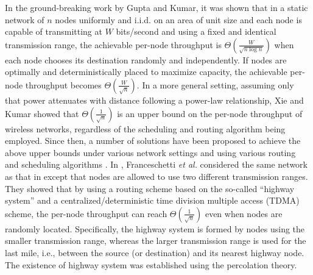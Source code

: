 \documentclass[english]{IEEEtran}
\theoremstyle{plain}
\theoremstyle{plain}
\theoremstyle{plain}
\theoremstyle{remark}
\begin{document}
In the ground-breaking work \cite{Gupta00Capacity} by Gupta and Kumar,
it was shown that in a static network of $n$ nodes uniformly and
i.i.d. on an area of unit size and each node is capable of transmitting
at $W$ bits/second and using a fixed and identical transmission range,
the achievable per-node throughput is $\Theta\left(\frac{W}{\sqrt{n\log n}}\right)$
when each node chooses its destination randomly and independently.
If nodes are optimally and deterministically placed to maximize capacity,
the achievable per-node throughput becomes $\Theta\left(\frac{W}{\sqrt{n}}\right)$.
In a more general setting, assuming only that power attenuates with
distance following a power-law relationship, Xie and Kumar \cite{Xie04A}
showed that $\Theta\left(\frac{1}{\sqrt{n}}\right)$ is an upper bound
on the per-node throughput of wireless networks, regardless of the
scheduling and routing algorithm being employed. Since then, a number
of solutions have been proposed to achieve the above upper bounds
under various network settings and using various routing and scheduling
algorithms \cite{Alfano09Capacity,Chau11Capacity,Cho06Capacity,Dousse06On,Franceschetti07Closing,Grossglauser02Mobility,Gupta00Capacity,Hu10A,Kulkarni04A,Li09Impacts,Li11The,Yang12Capacity}.
In \cite{Franceschetti07Closing}, Franceschetti \emph{et al.} considered
the same network as that in \cite{Gupta00Capacity} except that nodes
are allowed to use two different transmission ranges. They showed
that by using a routing scheme based on the so-called ``highway system''
and a centralized/deterministic time division multiple access (TDMA)
scheme, the per-node throughput can reach $\Theta\left(\frac{1}{\sqrt{n}}\right)$
even when nodes are randomly located. Specifically, the highway system
is formed by nodes using the smaller transmission range, whereas the
larger transmission range is used for the last mile, i.e., between
the source (or destination) and its nearest highway node. The existence
of highway system was established using the percolation theory. 
\end{document}
